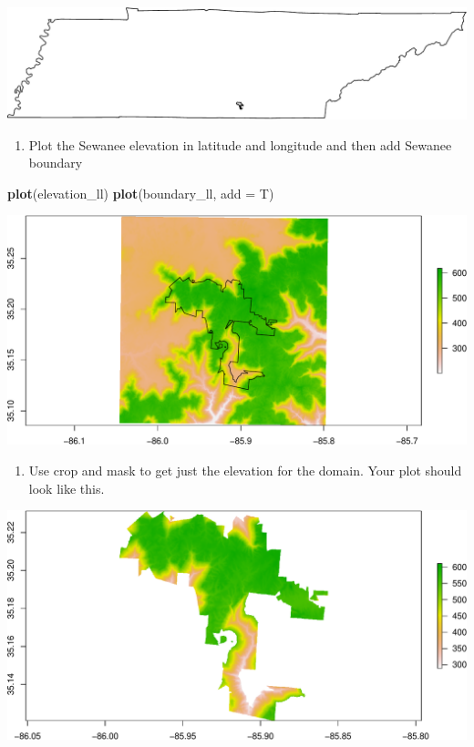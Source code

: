 \documentclass[
]{book}
\newenvironment{Shaded}{\begin{snugshade}}{\end{snugshade}}
\newcommand{\DataTypeTok}[1]{\textcolor[rgb]{0.13,0.29,0.53}{#1}}
\newcommand{\KeywordTok}[1]{\textcolor[rgb]{0.13,0.29,0.53}{\textbf{#1}}}
\newcommand{\NormalTok}[1]{#1}
\providecommand{\tightlist}{%
  \setlength{\itemsep}{0pt}\setlength{\parskip}{0pt}}
\begin{document}
\includegraphics{figures/unnamed-chunk-566-1.pdf}

\begin{enumerate}
\def\labelenumi{\arabic{enumi}.}
\setcounter{enumi}{21}
\tightlist
\item
  Plot the Sewanee elevation in latitude and longitude and then add Sewanee boundary
\end{enumerate}

\begin{Shaded}
\begin{Highlighting}[]
\KeywordTok{plot}\NormalTok{(elevation_ll)}
\KeywordTok{plot}\NormalTok{(boundary_ll, }\DataTypeTok{add =}\NormalTok{ T)}
\end{Highlighting}
\end{Shaded}

\includegraphics{figures/unnamed-chunk-567-1.pdf}

\begin{enumerate}
\def\labelenumi{\arabic{enumi}.}
\setcounter{enumi}{22}
\tightlist
\item
  Use crop and mask to get just the elevation for the domain. Your plot should look like this.
\end{enumerate}

\includegraphics{figures/unnamed-chunk-568-1.pdf}
\end{document}
